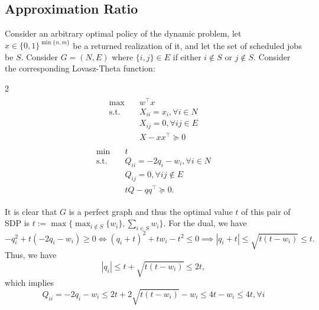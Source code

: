 \documentclass{article}
\newcommand{\R}{\mathbb{R}}
\newcommand{\symm}{\mathbb{S}}
\renewcommand{\symm}{\mathbb{S}}
\begin{document}
\subsection{Approximation Ratio}
Consider an arbitrary optimal policy of the dynamic problem, let $x\in \{0,1\}^{\min\{n,m\}}$ be a returned realization of it, and let the set of scheduled jobs be $S$.
Consider $G=(N,E)$ where $\{i,j\}\in E$ if either $i\notin S$ or $j\notin S$.
Consider the corresponding Lovasz-Theta function:
\begin{multicols}{2}
    \noindent
    \begin{align}
\label{SDP-P}
\tag{SDP-P}
\begin{split}
    \max\quad &w^\top x\\
    \text{s.t.}\quad &X_{ii}=x_i, \forall i\in N\\
    &X_{ij}=0,\forall ij\in E\\
    &X-xx^\top\succeq 0
\end{split}
\end{align}
\columnbreak
\begin{align}
\label{SDP-D}
\tag{SDP-D}
\begin{split}
    \min\quad &t\\
    \text{s.t.}\quad
    &Q_{ii}=-2q_i-w_i,\forall i \in N\\
    &Q_{ij}=0,\forall ij\notin E\\
    &tQ-qq^\top\succeq 0.
\end{split}
\end{align}
\end{multicols}
It is clear that $G$ is a perfect graph and thus the optimal value $t$ of this pair of SDP is $t:=\max\{\max_{i\notin S}\{w_i\}, \sum_{i\in S}w_i\}$.
For the dual, we have 
\[-q_i^2+t(-2q_i-w_i)\geq 0 \iff (q_i+t)^2+tw_i-t^2\leq 0 \implies |q_i+t|\leq\sqrt{t(t-w_i)}\leq t.\]
Thus, we have 
\[|q_i|\leq t+\sqrt{t(t-w_i)}\leq 2t,\]
which implies 
\[Q_{ii} = -2q_i-w_i\leq 2t+2\sqrt{t(t-w_i)}-w_i\leq 4t-w_i\leq 4t,\forall i\]
\end{document}
